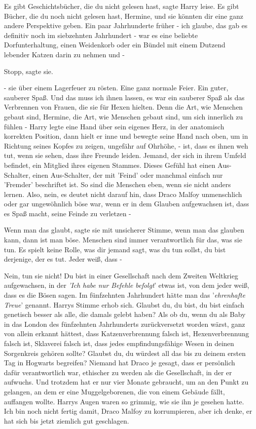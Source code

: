 \glqq{}Es gibt Geschichtsbücher, die du nicht gelesen hast\grqq{}, sagte Harry
leise. \glqq{}Es gibt Bücher, die du noch nicht gelesen hast, Hermine, und sie
könnten dir eine ganz andere Perspektive geben. Ein paar Jahrhunderte früher -
ich glaube, das gab es definitiv noch im siebzehnten Jahrhundert - war es eine
beliebte Dorfunterhaltung, einen Weidenkorb oder ein Bündel mit einem Dutzend
lebender Katzen darin zu nehmen und -\grqq{}

\glqq{}Stopp\grqq{}, sagte sie.

\glqq{}- sie über einem Lagerfeuer zu rösten. Eine ganz normale Feier. Ein guter,
sauberer Spaß. Und das muss ich ihnen lassen, es war ein sauberer Spaß als das
Verbrennen von Frauen, die sie für Hexen hielten. Denn die Art, wie Menschen
gebaut sind, Hermine, die Art, wie Menschen gebaut sind, um sich innerlich zu
fühlen -\grqq{} Harry legte eine Hand über sein eigenes Herz, in der anatomisch
korrekten Position, dann hielt er inne und bewegte seine Hand nach oben, um in
Richtung seines Kopfes zu zeigen, ungefähr auf Ohrhöhe, \glqq{}- ist, dass es
ihnen weh tut, wenn sie sehen, dass ihre Freunde leiden. Jemand, der sich in
ihrem Umfeld befindet, ein Mitglied ihres eigenen Stammes. Dieses Gefühl hat
einen Aus-Schalter, einen Aus-Schalter, der mit 'Feind' oder manchmal einfach
nur 'Fremder' beschriftet ist. So sind die Menschen eben, wenn sie nicht anders
lernen. Also, nein, es deutet nicht darauf hin, dass Draco Malfoy unmenschlich
oder gar ungewöhnlich böse war, wenn er in dem Glauben aufgewachsen ist, dass es
Spaß macht, seine Feinde zu verletzen -\grqq{}

\glqq{}Wenn man das glaubt\grqq{}, sagte sie mit unsicherer Stimme, \glqq{}wenn
man das glauben kann, dann ist man böse. Menschen sind immer verantwortlich für
das, was sie tun. Es spielt keine Rolle, was dir jemand sagt, was du tun sollst,
du bist derjenige, der es tut. Jeder weiß, dass -\grqq{}

\glqq{}Nein, tun sie nicht! Du bist in einer Gesellschaft nach dem Zweiten
Weltkrieg aufgewachsen, in der \emph{'Ich habe nur Befehle befolgt}' etwas ist,
von dem jeder weiß, dass es die Bösen sagen. Im fünfzehnten Jahrhundert hätte
man das '\emph{ehrenhafte Treue}' genannt.\grqq{} Harrys Stimme erhob sich.
\glqq{}Glaubst du, du bist, du bist einfach genetisch besser als alle, die damals
gelebt haben? Als ob du, wenn du als Baby in das London des fünfzehnten
Jahrhunderts zurückversetzt worden wärst, ganz von allein erkannt hättest, dass
Katzenverbrennung falsch ist, Hexenverbrennung falsch ist, Sklaverei falsch ist,
dass jedes empfindungsfähige Wesen in deinen Sorgenkreis gehören sollte? Glaubst
du, du würdest all das bis zu deinem ersten Tag in Hogwarts begreifen? Niemand
hat Draco je gesagt, dass er persönlich dafür verantwortlich war, ethischer zu
werden als die Gesellschaft, in der er aufwuchs. Und trotzdem hat er nur vier
Monate gebraucht, um an den Punkt zu gelangen, an dem er eine Muggelgeborenen,
die von einem Gebäude fällt, auffangen wollte.\grqq{} Harrys Augen waren so
grimmig, wie sie ihn je gesehen hatte. \glqq{}Ich bin noch nicht fertig damit,
Draco Malfoy zu korrumpieren, aber ich denke, er hat sich bis jetzt ziemlich gut
geschlagen.\grqq{}

